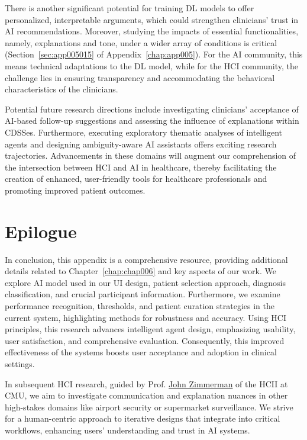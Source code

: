 \textcolor{revised}{There is another significant potential for training \ac{DL} models to offer personalized, interpretable arguments, which could strengthen clinicians' trust in \ac{AI} recommendations.
Moreover, studying the impacts of essential functionalities, namely, explanations and tone, under a wider array of conditions is critical (Section~\ref{sec:app005015} of Appendix~\ref{chap:app005}).
For the \ac{AI} community, this means technical adaptations to the \ac{DL} model, while for the \ac{HCI} community, the challenge lies in ensuring transparency and accommodating the behavioral characteristics of the clinicians.}

\textcolor{revised}{Potential future research directions include investigating clinicians' acceptance of \ac{AI}-based follow-up suggestions and assessing the influence of explanations within \acp{CDSSe}.
Furthermore, executing exploratory thematic analyses of intelligent agents and designing ambiguity-aware \ac{AI} assistants offers exciting research trajectories.
Advancements in these domains will augment our comprehension of the intersection between \ac{HCI} and \ac{AI} in healthcare, thereby facilitating the creation of enhanced, user-friendly tools for healthcare professionals and promoting improved patient outcomes.}

\section{Epilogue}
\label{sec:app005020}

In conclusion, this appendix is a comprehensive resource, providing additional details related to Chapter~\ref{chap:chap006} and key aspects of our work.
We explore \ac{AI} model used in our \ac{UI} design, patient selection approach, diagnosis classification, and crucial participant information.
Furthermore, we examine performance recognition, thresholds, and patient curation strategies in the current system, highlighting methods for robustness and accuracy.
Using \ac{HCI} principles, this research advances intelligent agent design, emphasizing usability, user satisfaction, and comprehensive evaluation.
Consequently, this improved effectiveness of the systems boosts user acceptance and adoption in clinical settings.

In subsequent \ac{HCI} research, guided by Prof. \href{https://www.hcii.cmu.edu/people/john-zimmerman}{John Zimmerman} of the \ac{HCII} at \ac{CMU}, we aim to investigate communication and explanation nuances in other high-stakes domains like airport security or supermarket surveillance.
We strive for a human-centric approach to iterative designs that integrate into critical workflows, enhancing users' understanding and trust in \ac{AI} systems.

